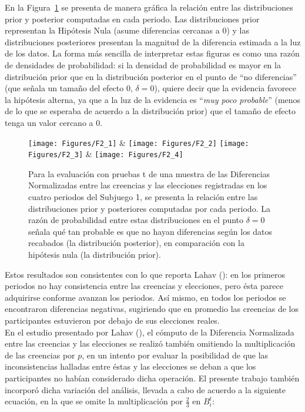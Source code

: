 En la Figura~\ref{fig:DN_S1} se presenta de manera gráfica la relación entre las distribuciones prior y posterior computadas en cada periodo. Las distribuciones prior representan la Hipótesis Nula (asume diferencias  cercanas a 0) y las distribuciones posteriores presentan la magnitud de la diferencia estimada a la luz de los datos. La forma más sencilla de interpretar estas figuras es como una razón de densidades de probabilidad: si la densidad de probabilidad es mayor en la distribución prior que en la distribución posterior en el punto de ``no diferencias'' (que señala un tamaño del efecto 0, $\delta = 0$), quiere decir que la evidencia favorece la hipótesis alterna, ya que a la luz de la evidencia es ``\textit{muy poco probable}'' (menos de lo que se esperaba de acuerdo a la distribución prior) que el tamaño de efecto tenga un valor cercano a 0.\\
  
\begin{figure}[hp]
\centering
\texttt{[image: Figures/F2\_1]} & \texttt{[image: Figures/F2\_2]} 
\texttt{[image: Figures/F2\_3]} & \texttt{[image: Figures/F2\_4]} 
\decoRule
\caption[Diferencias Normalizadas entre creencias y elecciones en el Subjuegoo 1 (Factor de Bayes)]{Para la evaluación con pruebas t de una muestra de las Diferencias Normalizadas entre las creencias y las elecciones registradas en los cuatro periodos del Subjuego 1, se presenta la relación entre las distribuciones prior y posteriores computadas por cada periodo. La razón de probabilidad entre estas distribuciones en el punto $\delta = 0$ señala qué tan probable es que no hayan diferencias según los datos recabados (la distribución posterior), en comparación con la hipótesis nula (la distribución prior).}
\label{fig:DN_S1}
\end{figure}

Estos resultados son consistentes con lo que reporta Lahav (\citeyear{Lahav}): en los primeros periodos no hay consistencia entre las creencias y elecciones, pero ésta parece adquirirse conforme avanzan los periodos. Así mismo, en todos los periodos se encontraron diferencias negativas, sugiriendo que en promedio las creencias de los participantes estuvieron por debajo de sus elecciones reales.\\

En el estudio presentado por Lahav (\citeyear{Lahav}), el cómputo de la Diferencia Normalizada entre las creencias y las elecciones se realizó también omitiendo la multiplicación de las creencias por $p$, en un intento por evaluar la posibilidad de que las inconsistencias halladas entre éstas y las elecciones se deban a que los participantes no habían considerado dicha operación. El presente trabajo también incorporó dicha variación del análisis, llevada a cabo de acuerdo a la siguiente ecuación, en la que se omite la multiplicación por $\frac{2}{3}$ en $B_i^t$:\\

